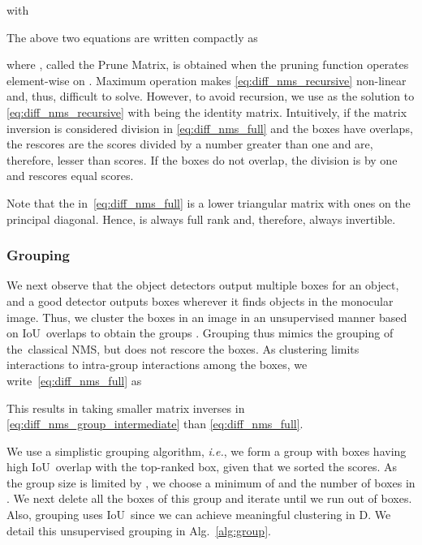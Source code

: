 \documentclass[final]{cvpr}
\newcommand{\iou}{IoU}
\newcommand{\twoD}{D}
\newcommand{\iouTwoD}{\iou}
\newcommand{\classicalNms}{classical NMS}
\newcommand{\thatIs}{\textit{i.e.}}
\begin{document}
            with
            
            The above two equations are written compactly as 
            
            where , called the Prune Matrix, is obtained 
            when the pruning function  operates element-wise
            on . 
            Maximum operation makes \eqref{eq:diff_nms_recursive} non-linear~\cite{kumar2013estimation} and, thus, difficult to solve. 
            However, to avoid recursion, we use 
            as the solution to \eqref{eq:diff_nms_recursive} with  being the identity matrix. 
            Intuitively, if the matrix inversion is considered division in \eqref{eq:diff_nms_full} and the boxes have overlaps, the rescores are the scores divided by a number greater than one and are, therefore, lesser than scores. 
            If the boxes do not overlap, the division is by one and rescores equal scores.
            
            Note that the  in~\eqref{eq:diff_nms_full} is a lower triangular matrix with ones on the principal diagonal. Hence,  is always full rank and, therefore, always invertible.

\subsubsection{Grouping}
            We next observe that the object detectors output multiple boxes for an object, and a good detector outputs boxes wherever it finds objects in the monocular image. 
            Thus, we cluster the boxes in an image in an unsupervised manner based on \iouTwoD~overlaps to obtain the groups . 
            Grouping thus mimics the grouping of the~\classicalNms, but does not rescore the boxes. 
            As clustering limits interactions to intra-group interactions among the boxes, we write~\eqref{eq:diff_nms_full} as
            
            This results in taking smaller matrix inverses in \eqref{eq:diff_nms_group_intermediate} than \eqref{eq:diff_nms_full}.
            
            We use a simplistic grouping algorithm, \thatIs, we form a group  with boxes  having high \iouTwoD~overlap with the top-ranked box, given that we sorted the scores. 
            As the group size is limited by , we choose a minimum of  and the number of boxes in . 
            We next delete all the boxes of this group and iterate until we run out of boxes.
            Also, grouping uses \iouTwoD~since we can achieve meaningful clustering in \twoD. 
            We detail this unsupervised grouping in Alg.~\ref{alg:group}. 
\end{document}
